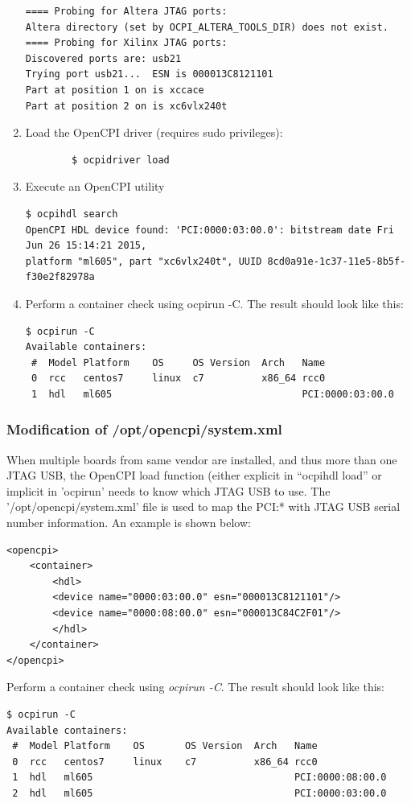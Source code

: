 \begin{enumerate}
\begin{verbatim}
==== Probing for Altera JTAG ports:
Altera directory (set by OCPI_ALTERA_TOOLS_DIR) does not exist.
==== Probing for Xilinx JTAG ports:
Discovered ports are: usb21
Trying port usb21...  ESN is 000013C8121101
Part at position 1 on is xccace
Part at position 2 on is xc6vlx240t
	\end{verbatim}\par\smallskip
	\item Load the OpenCPI driver (requires sudo privileges):\smallskip
	\begin{verbatim}
		$ ocpidriver load
	\end{verbatim}
	\item Execute an OpenCPI utility\smallskip
	\begin{verbatim}
$ ocpihdl search
OpenCPI HDL device found: 'PCI:0000:03:00.0': bitstream date Fri Jun 26 15:14:21 2015,
platform "ml605", part "xc6vlx240t", UUID 8cd0a91e-1c37-11e5-8b5f-f30e2f82978a
	\end{verbatim}
	\item Perform a container check using ocpirun -C. The result
	should look like this:\smallskip
	\begin{verbatim}
$ ocpirun -C
Available containers:
 #  Model Platform    OS     OS Version  Arch   Name
 0  rcc   centos7     linux  c7          x86_64 rcc0
 1  hdl   ml605                                 PCI:0000:03:00.0
  	\end{verbatim}
\end{enumerate}

\subsubsection{Modification of /opt/opencpi/system.xml}
When multiple boards from same vendor are installed, and thus more than one JTAG USB, the OpenCPI load function (either explicit in ``ocpihdl load'' or implicit in 'ocpirun' needs to know which JTAG USB to use. The '/opt/opencpi/system.xml' file is used to map the PCI:* with JTAG USB serial number information. An example is shown below:
	\begin{verbatim}
<opencpi>
    <container>
        <hdl>
        <device name="0000:03:00.0" esn="000013C8121101"/>
        <device name="0000:08:00.0" esn="000013C84C2F01"/>
        </hdl>
    </container>
</opencpi>
	\end{verbatim}
Perform a container check using \textit{ocpirun -C}. The result should look like this:
	\begin{verbatim}
$ ocpirun -C
Available containers:
 #  Model Platform    OS       OS Version  Arch   Name
 0  rcc   centos7     linux    c7          x86_64 rcc0
 1  hdl   ml605                                   PCI:0000:08:00.0
 2  hdl   ml605                                   PCI:0000:03:00.0
	\end{verbatim}


